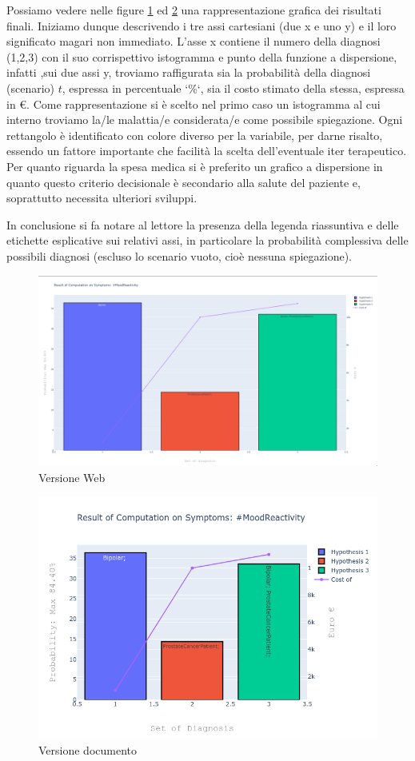 Possiamo vedere nelle figure \ref{fig: A_web} ed \ref{fig: A_doc} una rappresentazione
grafica dei risultati finali. Iniziamo dunque descrivendo i tre assi cartesiani (due x e uno y) e il loro significato magari non immediato. L'asse x 
contiene il numero della diagnosi (1,2,3) con il suo corrispettivo istogramma e 
punto della funzione a dispersione, infatti ,sui due assi y, troviamo raffigurata sia la probabilità della diagnosi (scenario) $ t $, 
espressa in percentuale `\%`, sia il costo stimato della stessa,
espressa in €. Come rappresentazione si è scelto nel primo caso un istogramma al
cui interno troviamo
la/le malattia/e considerata/e come possibile spiegazione. 
Ogni rettangolo è identificato con colore diverso per la variabile, per darne risalto, essendo
un fattore importante che facilità la scelta 
dell'eventuale iter terapeutico. Per quanto riguarda la spesa medica si è preferito un
grafico a dispersione in quanto questo criterio decisionale è secondario alla salute del 
paziente e, soprattutto necessita ulteriori sviluppi.

In conclusione si fa notare al lettore la presenza della legenda riassuntiva e delle etichette esplicative sui relativi assi,
in particolare la probabilità complessiva delle possibili diagnosi (escluso lo scenario vuoto, cioè nessuna spiegazione).

\begin{figure}
	\centering
	\includegraphics[width=\linewidth]{plot/Caso_di_studio.png}
	\caption{Versione Web}
	\label{fig: A_web}
\end{figure}

\begin{figure}
	\centering
	\includegraphics[width=\linewidth]{plot/caso_di_studio_alt.png}
	\caption{Versione documento}
	\label{fig: A_doc}
\end{figure}